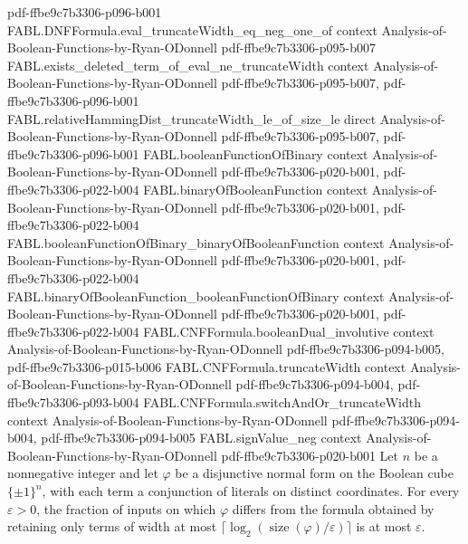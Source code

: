 \begin{theorem}
{    pdf-ffbe9c7b3306-p096-b001}
\proofstep
  {FABL.DNFFormula.eval_truncateWidth_eq_neg_one_of}
  {context}
  {Analysis-of-Boolean-Functions-by-Ryan-ODonnell}
  {pdf-ffbe9c7b3306-p095-b007}
\proofstep
  {FABL.exists_deleted_term_of_eval_ne_truncateWidth}
  {context}
  {Analysis-of-Boolean-Functions-by-Ryan-ODonnell}
  {pdf-ffbe9c7b3306-p095-b007,
    pdf-ffbe9c7b3306-p096-b001}
\proofstep
  {FABL.relativeHammingDist_truncateWidth_le_of_size_le}
  {direct}
  {Analysis-of-Boolean-Functions-by-Ryan-ODonnell}
  {pdf-ffbe9c7b3306-p095-b007,
    pdf-ffbe9c7b3306-p096-b001}
\proofstep
  {FABL.booleanFunctionOfBinary}
  {context}
  {Analysis-of-Boolean-Functions-by-Ryan-ODonnell}
  {pdf-ffbe9c7b3306-p020-b001,
    pdf-ffbe9c7b3306-p022-b004}
\proofstep
  {FABL.binaryOfBooleanFunction}
  {context}
  {Analysis-of-Boolean-Functions-by-Ryan-ODonnell}
  {pdf-ffbe9c7b3306-p020-b001,
    pdf-ffbe9c7b3306-p022-b004}
\proofstep
  {FABL.booleanFunctionOfBinary_binaryOfBooleanFunction}
  {context}
  {Analysis-of-Boolean-Functions-by-Ryan-ODonnell}
  {pdf-ffbe9c7b3306-p020-b001,
    pdf-ffbe9c7b3306-p022-b004}
\proofstep
  {FABL.binaryOfBooleanFunction_booleanFunctionOfBinary}
  {context}
  {Analysis-of-Boolean-Functions-by-Ryan-ODonnell}
  {pdf-ffbe9c7b3306-p020-b001,
    pdf-ffbe9c7b3306-p022-b004}
\proofstep
  {FABL.CNFFormula.booleanDual_involutive}
  {context}
  {Analysis-of-Boolean-Functions-by-Ryan-ODonnell}
  {pdf-ffbe9c7b3306-p094-b005,
    pdf-ffbe9c7b3306-p015-b006}
\proofstep
  {FABL.CNFFormula.truncateWidth}
  {context}
  {Analysis-of-Boolean-Functions-by-Ryan-ODonnell}
  {pdf-ffbe9c7b3306-p094-b004,
    pdf-ffbe9c7b3306-p093-b004}
\proofstep
  {FABL.CNFFormula.switchAndOr_truncateWidth}
  {context}
  {Analysis-of-Boolean-Functions-by-Ryan-ODonnell}
  {pdf-ffbe9c7b3306-p094-b004,
    pdf-ffbe9c7b3306-p094-b005}
\proofstep
  {FABL.signValue_neg}
  {context}
  {Analysis-of-Boolean-Functions-by-Ryan-ODonnell}
  {pdf-ffbe9c7b3306-p020-b001}
Let $n$ be a nonnegative integer and let $\varphi$ be a disjunctive normal form on the
Boolean cube $\{\pm1\}^n$, with each term a conjunction of literals on distinct
coordinates. For every $\varepsilon>0$, the fraction of inputs on which $\varphi$
differs from the formula obtained by retaining only terms of width at most
$\lceil\log_2(\operatorname{size}(\varphi)/\varepsilon)\rceil$ is at most $\varepsilon$.
\end{theorem}

